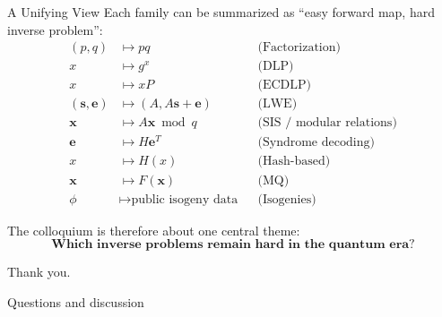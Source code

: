 \documentclass[aspectratio=169]{beamer}
\begin{document}
	
	\begin{frame}{A Unifying View}
		Each family can be summarized as ``easy forward map, hard inverse problem'':
		\[
		\begin{aligned}
			(p,q) &\mapsto pq && \text{(Factorization)} \\
			x &\mapsto g^x && \text{(DLP)} \\
			x &\mapsto xP && \text{(ECDLP)} \\
			(\bm{s},\bm{e}) &\mapsto (A, A\bm{s}+\bm{e}) && \text{(LWE)} \\
			\bm{x} &\mapsto A\bm{x} \bmod q && \text{(SIS / modular relations)} \\
			\bm{e} &\mapsto H\bm{e}^T && \text{(Syndrome decoding)} \\
			x &\mapsto H(x) && \text{(Hash-based)} \\
			\bm{x} &\mapsto F(\bm{x}) && \text{(MQ)} \\
			\phi &\mapsto \text{public isogeny data} && \text{(Isogenies)}
		\end{aligned}
		\]
		
		\vspace{0.5em}
		The colloquium is therefore about one central theme:
		\[
		\textbf{Which inverse problems remain hard in the quantum era?}
		\]
	\end{frame}
	
	
	\begin{frame}
		\centering
		{\LARGE Thank you.}
		
		\vspace{0.5em}
		{\large Questions and discussion}
	\end{frame}
	
\end{document}
